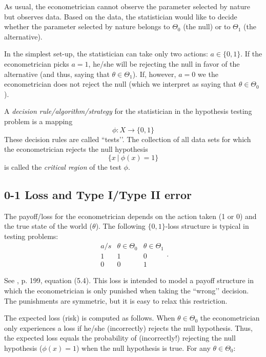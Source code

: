 \documentclass[11pt]{article} %
\begin{document}
As usual, the econometrician cannot observe the parameter selected by nature but observes data. Based on the data, the statistician would like to decide whether the parameter selected by nature belongs to $\Theta_0$ (the null) or to $\Theta_1$ (the alternative). 

In the simplest set-up, the statistician can take only two actions: $a \in \{0,1\}$. If the econometrician picks $a=1$, he/she will be rejecting the null in favor of the alternative (and thus, saying that $\theta \in \Theta_1$). If, however, $a=0$ we the econometrician does not reject the null (which we interpret as saying that $\theta \in \Theta_0$).  

A \emph{decision rule/algorithm/strategy} for the statistician in the hypothesis testing problem is a mapping
\begin{equation*}
\phi:X \rightarrow \{0,1\}
\end{equation*}
These decision rules are called ``tests’’. The collection of all data sets for which the econometrician rejects the null hypothesis 
$$\{x \: | \: \phi(x)=1\} $$
\noindent is called the \emph{critical region} of the test $\phi$. \\


\subsection{0-1 Loss and Type I/Type II error}

The payoff/loss for the econometrician depends on the action taken (1 or 0) and the true state of the world ($\theta$). The following $\{0,1\}$-loss structure is typical in testing problems:
\begin{equation*}
\left.\begin{array}{ccc} a/s& \theta \in \Theta_0 & \theta \in \Theta_1 \\ 1 & 1 & 0 \\0 & 0 & 1\end{array}.\right.
\end{equation*}

See \cite{Ferguson67}, p. 199, equation (5.4). This loss is intended to model a payoff structure in which the econometrician is only punished when taking the ``wrong’’ decision. The punishments are symmetric, but it is easy to relax this restriction. 

The expected loss (risk) is computed as follows. When $\theta \in \Theta_0$ the econometrician only experiences a loss if he/she (incorrectly) rejects the null hypothesis. Thus, the expected loss equals the probability of (incorrectly!) rejecting the null hypothesis ($\phi(x)=1$) when the null hypothesis is true. For any $\theta \in \Theta_0:$ 
\end{document}
